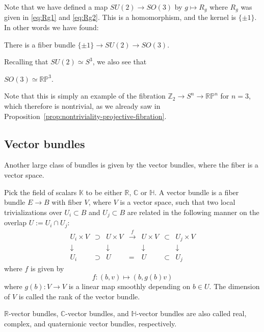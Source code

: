 \documentclass[12pt]{article}
\numberwithin{equation}{section}
\numberwithin{figure}{section}
\theoremstyle{remark}
\def\bC{\mathbb{C}}
\def\bH{\mathbb{H}}
\def\bK{\mathbb{K}}
\def\bR{\mathbb{R}}
\def\bZ{\mathbb{Z}}
\def\RP{\mathbb{RP}}
\begin{document}
Note that we have defined a map $SU(2)\to SO(3)$ by $g\mapsto R_g$ where $R_g$ was given in \eqref{eq:Rg1} and \eqref{eq:Rg2}.
This is a homomorphism, and the kernel is $\{\pm 1\}$.
In other words we have found:
\begin{example}
  There is a fiber bundle $
    \{\pm 1\} \to SU(2) \to SO(3). 
  $
\end{example}
Recalling that $SU(2)\simeq S^3$, we also see that 
\begin{proposition}
$SO(3)\simeq \RP^3$.  
\end{proposition}

Note that this is simply an example of the fibration $\bZ_2\to S^n\to \RP^n$
for $n=3$,
which therefore is nontrivial, as we already saw in Proposition~\ref{prop:nontriviality-projective-fibration}.

\subsection{Vector bundles}

Another large class of bundles is given by the vector bundles,
where the fiber is a vector space.

\begin{definition}
  Pick the field of scalars $\bK$ to be either $\bR$, $\bC$ or $\bH$.
  A vector bundle is a fiber bundle $E\to B$ with fiber $V$,
  where $V$ is a vector space, such that two local trivializations over $U_i \subset B$
  and $U_j\subset B$ are related in the following manner on the overlap $U:=U_i\cap U_j$:
  \begin{equation}
  \begin{array}{cccccccc}
    U_i \times V &\supset& U \times V & \xrightarrow{f } & 
    U \times V & \subset & U_j\times V \\
    \downarrow & & \downarrow & & \downarrow & & \downarrow \\
    U_i & \supset & U  & = & U  & \subset & U_j
  \end{array}
  \end{equation}
  where $f $ is given by \begin{equation}
    f : (b,v) \mapsto (b, g (b) v)
    \label{eq:vec-bundle-transition-functions}
  \end{equation} where $g (b): V\to V$ is a linear map smoothly depending on $b\in U$.
  The dimension of $V$ is called the rank of the vector bundle.
\end{definition}
$\bR$-vector bundles, $\bC$-vector bundles, and $\bH$-vector bundles
are also called real, complex, and quaternionic vector bundles, respectively.
\end{document}
